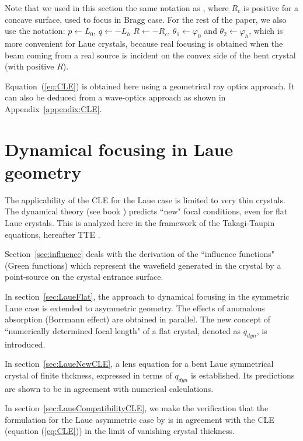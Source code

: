 \documentclass[preprint]{iucr}              %
\begin{document}
Note that we used in this section the same notation as \cite{CK}, where $R_c$ is positive for a concave surface, used to focus in Bragg case. For the rest of the paper, we also use the notation: $p \leftarrow L_0$, $q \leftarrow -L_h$ $R \leftarrow -R_c$, $\theta_1 \leftarrow \varphi_0$ and $\theta_2 \leftarrow \varphi_h$, which is more convenient for Laue crystals, because real focusing is obtained when the beam coming from a real source is incident on the convex side of the bent crystal (with positive $R$).

Equation~(\ref{eq:CLE}) is obtained here using a geometrical ray optics approach. It can also be deduced from a wave-optics approach as shown in Appendix~\ref{appendix:CLE}.

\section{Dynamical focusing in Laue geometry}
\label{sec:dynamlicalLaue}

The applicability of the CLE for the Laue case is limited to very thin crystals. The dynamical theory (see book \cite{authierbook})
predicts ``new" focal conditions, even for flat Laue crystals.
This is analyzed here in the framework of the Takagi-Taupin equations, hereafter TTE \cite{Takagi1962, Takagi, Taupin, Taupin1967}. 

Section~\ref{sec:influence} deals with the derivation of the ``influence functions" (Green functions) which represent the wavefield generated in the crystal by a point-source on the crystal entrance surface.

In section~\ref{sec:LaueFlat}, the approach to dynamical focusing in the symmetric Laue case
\cite{kushnir, GuigayFerrero2013}
is extended to asymmetric geometry. The effects of anomalous absorption (Borrmann effect) are obtained in parallel. The new concept of ``numerically determined focal length" of a flat crystal, denoted as $q_{dyn}$, is introduced.

In section~\ref{sec:LaueNewCLE}, a lens equation for a bent Laue symmetrical crystal of finite thckness, expressed in terms of $q_{dyn}$ is established. Its predictions are shown to be in agreement with numerical calculations. 

In section~\ref{sec:LaueCompatibilityCLE}, we make the verification that the formulation for the Laue asymmetric case by
\cite{GuigayFerrero2016} is in agreement with the CLE (equation (\ref{eq:CLE})) in the limit of vanishing crystal thickness.
\end{document}
